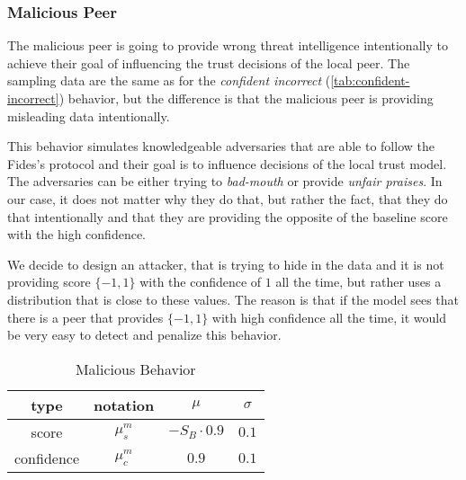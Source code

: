 \subsubsection{Malicious Peer}
\label{subsubsec:malicious-peer}
The malicious peer is going to provide wrong threat intelligence intentionally to achieve their goal of influencing the trust decisions of the local peer. 
The sampling data are the same as for the \textit{confident incorrect} (\ref{tab:confident-incorrect}) behavior, but the difference is that the malicious peer is providing misleading data intentionally.

This behavior simulates knowledgeable adversaries that are able to follow the Fides's protocol and their goal is to influence decisions of the local trust model.
The adversaries can be either trying to \textit{bad-mouth} or provide \textit{unfair praises}.
In our case, it does not matter why they do that, but rather the fact, that they do that intentionally and that they are providing the opposite of the baseline score with the high confidence.

We decide to design an attacker, that is trying to hide in the data and it is not providing score $\{-1, 1\}$ with the confidence of $1$ all the time, but rather uses a distribution that is close to these values.
The reason is that if the model sees that there is a peer that provides $\{-1, 1\}$ with high confidence all the time, it would be very easy to detect and penalize this behavior.

\begin{table}[!ht]
    \centering
    \begin{tabular}{c|c|c|c}
        type & notation & $\mu$ & $\sigma$ \\
        \hline
        score & $\mu^{m}_{s}$ & $-S_{B} \cdot 0.9$ & $0.1$ \\
        confidence & $\mu^{m}_{c}$ &  $0.9$ & $0.1$ \\
    \end{tabular}
    \caption{Malicious Behavior}
    \label{tab:malicious-peer}
\end{table}

